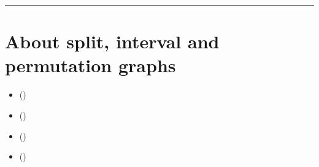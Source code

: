 \documentclass[a4paper,12pt,english]{sphinxhowto}
\begin{document}
\bigskip\hrule\bigskip



\section{About split, interval and permutation graphs}
\label{\detokenize{tutorial:about-split-interval-and-permutation-graphs}}\label{\detokenize{tutorial:permutation-tutorial-label}}
\begin{sphinxShadowBox}
\begin{itemize}
\item {} 
\label{\detokenize{tutorial:id315}}{\hyperref[\detokenize{tutorial:a-multiply-perfect-graph}]{}} ()

\item {} 
\label{\detokenize{tutorial:id316}}{\hyperref[\detokenize{tutorial:who-is-the-liar}]{}} ()

\item {} 
\label{\detokenize{tutorial:id317}}{\hyperref[\detokenize{tutorial:generating-permutation-graphs}]{}} ()

\item {} 
\label{\detokenize{tutorial:id318}}{\hyperref[\detokenize{tutorial:recognizing-permutation-graphs}]{}} ()

\end{itemize}
\end{sphinxShadowBox}
\end{document}
